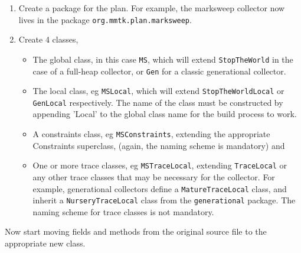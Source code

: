 \documentclass[10pt]{article}
\newcommand{\code}[1]{\lstinline!#1!}
\begin{document}
\begin{enumerate}
\item Create a package for the plan.  For example, the marksweep collector now
  lives in the package \code{org.mmtk.plan.marksweep}.

\item Create 4 classes,
  \begin{itemize}
  \item The global class, in this case \code{MS}, which will extend
  \code{StopTheWorld} in the case of a full-heap collector, or
  \code{Gen} for a classic generational collector.

  \item The local class, eg \code{MSLocal}, which will extend
  \code{StopTheWorldLocal} or \code{GenLocal} respectively.  The name
  of the class must be constructed by appending 'Local' to the global
  class name for the build process to work.

  \item A constraints class, eg \code{MSConstraints}, extending
  the appropriate Constraints superclass, (again, the naming scheme is
  mandatory) and

  \item One or more trace classes, eg \code{MSTraceLocal}, extending
  \code{TraceLocal} or any other trace classes that may
  be necessary for the collector.  For example, generational
  collectors define a \code{MatureTraceLocal} class, and inherit a
  \code{NurseryTraceLocal} class from the \code{generational} package.
  The naming scheme for trace classes is not mandatory.
  \end{itemize}

\end{enumerate}

Now start moving fields and methods from the original source file to
the appropriate new class.
\end{document}
